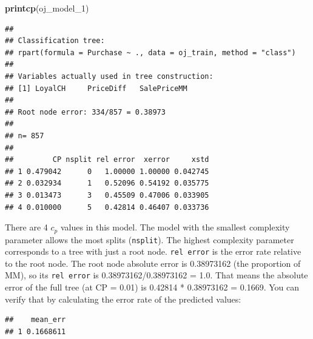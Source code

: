 \documentclass[
]{book}
\newenvironment{Shaded}{\begin{snugshade}}{\end{snugshade}}
\newcommand{\DataTypeTok}[1]{\textcolor[rgb]{0.13,0.29,0.53}{#1}}
\newcommand{\DecValTok}[1]{\textcolor[rgb]{0.00,0.00,0.81}{#1}}
\newcommand{\KeywordTok}[1]{\textcolor[rgb]{0.13,0.29,0.53}{\textbf{#1}}}
\newcommand{\NormalTok}[1]{#1}
\newcommand{\OperatorTok}[1]{\textcolor[rgb]{0.81,0.36,0.00}{\textbf{#1}}}
\newcommand{\StringTok}[1]{\textcolor[rgb]{0.31,0.60,0.02}{#1}}
\begin{document}
\begin{Shaded}
\begin{Highlighting}[]
\KeywordTok{printcp}\NormalTok{(oj_model_}\DecValTok{1}\NormalTok{)}
\end{Highlighting}
\end{Shaded}

\begin{verbatim}
## 
## Classification tree:
## rpart(formula = Purchase ~ ., data = oj_train, method = "class")
## 
## Variables actually used in tree construction:
## [1] LoyalCH     PriceDiff   SalePriceMM
## 
## Root node error: 334/857 = 0.38973
## 
## n= 857 
## 
##         CP nsplit rel error  xerror     xstd
## 1 0.479042      0   1.00000 1.00000 0.042745
## 2 0.032934      1   0.52096 0.54192 0.035775
## 3 0.013473      3   0.45509 0.47006 0.033905
## 4 0.010000      5   0.42814 0.46407 0.033736
\end{verbatim}

There are 4 \(c_p\) values in this model. The model with the smallest complexity parameter allows the most splits (\texttt{nsplit}). The highest complexity parameter corresponds to a tree with just a root node. \texttt{rel\ error} is the error rate relative to the root node. The root node absolute error is 0.38973162 (the proportion of MM), so its \texttt{rel\ error} is 0.38973162/0.38973162 = 1.0. That means the absolute error of the full tree (at CP = 0.01) is 0.42814 * 0.38973162 = 0.1669. You can verify that by calculating the error rate of the predicted values:

\begin{Shaded}
\end{Shaded}

\begin{verbatim}
##    mean_err
## 1 0.1668611
\end{verbatim}
\end{document}
